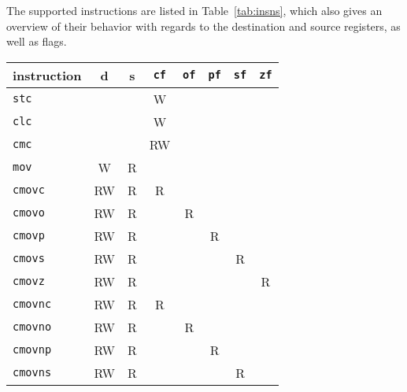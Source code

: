 \documentclass[a4paper,11pt]{kth-mag}
\begin{document}
\cite{x86_timing}



The supported instructions are listed in Table~\ref{tab:insns}, which also gives an overview of their behavior with regards to the destination and source registers, as well as flags.

\begin{table}
\centering
\begin{tabular}{l|cc|ccccc}
instruction   & d  & s  & \verb|cf| & \verb|of| & \verb|pf| & \verb|sf| & \verb|zf| \\
\hline
\verb|stc|    &    &    & W         &           &           &           &           \\
\verb|clc|    &    &    & W         &           &           &           &           \\
\verb|cmc|    &    &    & RW        &           &           &           &           \\
\hline
\verb|mov|    & W  & R  &           &           &           &           &           \\
\verb|cmovc|  & RW & R  & R         &           &           &           &           \\
\verb|cmovo|  & RW & R  &           & R         &           &           &           \\
\verb|cmovp|  & RW & R  &           &           & R         &           &           \\
\verb|cmovs|  & RW & R  &           &           &           & R         &           \\
\verb|cmovz|  & RW & R  &           &           &           &           & R         \\
\verb|cmovnc| & RW & R  & R         &           &           &           &           \\
\verb|cmovno| & RW & R  &           & R         &           &           &           \\
\verb|cmovnp| & RW & R  &           &           & R         &           &           \\
\verb|cmovns| & RW & R  &           &           &           & R         &           \\

\end{tabular}
\end{table}
\end{document}
